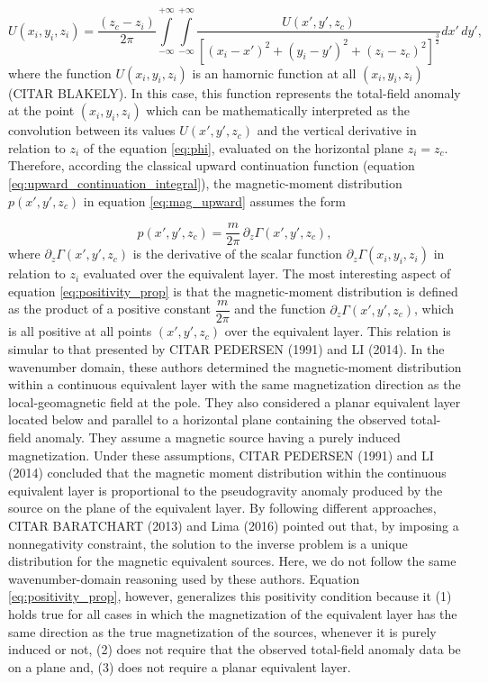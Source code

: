 \begin{equation}
U(x_i,y_i,z_i) = \dfrac{(z_c-z_i)}{2\pi} \int \limits_{-\infty}^{+\infty } \int \limits_{-\infty}^{+\infty }  \dfrac{U(x',y',z_c) }{[(x_i-x')^2 + (y_i-y')^2 + (z_i-z_c)^2]^{\frac{3}{2}}}    dx' \,dy',
\label{eq:upward_continuation_integral}
\end{equation}
where the function $U(x_i,y_i,z_i)$ is an hamornic function at all $(x_i,y_i,z_i)$ (CITAR BLAKELY). In this case, this function represents the total-field anomaly at the point $(x_i,y_i,z_i)$ which can be mathematically interpreted as the convolution between its values $U(x',y',z_c)$ and the vertical derivative in relation to $z_i$ of the equation \ref{eq:phi}, evaluated on the horizontal plane $z_i =z_c$. Therefore, according the classical upward continuation function (equation \ref{eq:upward_continuation_integral}), the magnetic-moment distribution $p(x',y',z_c)$ in equation \ref{eq:mag_upward} assumes the form 

\begin{equation}
p(x',y',z_c) = \dfrac{m}{2\pi} \, \partial_{z} \Gamma(x',y',z_c) ,
\label{eq:positivity_prop}
\end{equation}
where $\partial_{z} \Gamma(x',y',z_c)$ is the derivative of the scalar function $\partial_{z} \Gamma(x_i,y_i,z_i)$ in relation to $z_i$ evaluated over the equivalent layer. The most interesting aspect of equation \ref{eq:positivity_prop} is that the magnetic-moment distribution is defined as the product of a positive constant $\dfrac{m}{2\pi}$ and the function $\partial_{z} \Gamma(x',y',z_c)$, which is all positive at all points $(x',y',z_c)$ over the equivalent layer. This relation is simular to that presented by CITAR PEDERSEN (1991) and LI (2014). In the wavenumber domain, these authors determined the
magnetic-moment distribution within a continuous equivalent layer with the same magnetization direction as the local-geomagnetic field at the pole. They also considered a planar equivalent layer located below and parallel to a horizontal plane containing the observed total-field anomaly. They assume a magnetic source having a purely induced magnetization. Under these assumptions, CITAR PEDERSEN (1991) and LI (2014) concluded that the magnetic moment distribution within the continuous equivalent layer is proportional to the pseudogravity anomaly produced by the source on the plane of the equivalent layer. By following different approaches, CITAR BARATCHART (2013) and Lima (2016) pointed out that, by imposing a nonnegativity constraint, the solution to the inverse problem is a unique distribution for the magnetic equivalent sources. Here, we do not follow the same wavenumber-domain reasoning used by these authors.
Equation \ref{eq:positivity_prop}, however, generalizes this positivity condition because it (1) holds true for all cases in which the magnetization of the equivalent layer has the same direction as the true
magnetization of the sources, whenever it is purely induced or not, (2) does not require that the observed total-field anomaly data be on a plane and, (3) does not require a planar equivalent layer.

